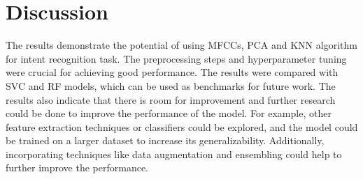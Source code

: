 \documentclass[conference]{IEEEtran}
\begin{document}
\section{Discussion}
The results demonstrate the potential of using MFCCs, PCA and KNN algorithm for intent recognition task.
The preprocessing steps and hyperparameter tuning were crucial for achieving good performance.
The results were compared with SVC and RF models, which can be used as benchmarks for future work.
The results also indicate that there is room for improvement and further research could be done to improve the performance of the model.
For example, other feature extraction techniques or classifiers could be explored, and the model could be trained on a larger dataset to increase its generalizability.
Additionally, incorporating techniques like data augmentation and ensembling could help to further improve the performance.

\nocite{*}


\end{document}
